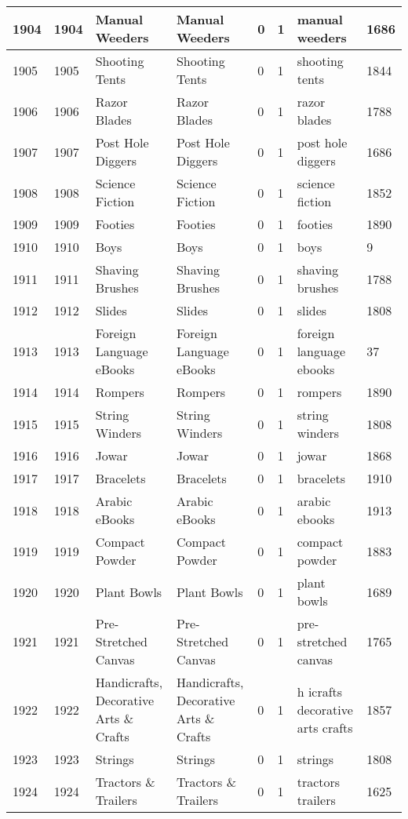 \begin{longtable}{|l|l|l|l|l|l|l|l|}
1904 & 1904 & Manual Weeders & Manual Weeders & 0 & 1 & manual weeders & 1686 \\ \hline 
1905 & 1905 & Shooting Tents & Shooting Tents & 0 & 1 & shooting tents & 1844 \\ \hline 
1906 & 1906 & Razor Blades & Razor Blades & 0 & 1 & razor blades & 1788 \\ \hline 
1907 & 1907 & Post Hole Diggers & Post Hole Diggers & 0 & 1 & post hole diggers & 1686 \\ \hline 
1908 & 1908 & Science Fiction & Science Fiction & 0 & 1 & science fiction & 1852 \\ \hline 
1909 & 1909 & Footies & Footies & 0 & 1 & footies & 1890 \\ \hline 
1910 & 1910 & Boys & Boys & 0 & 1 & boys & 9 \\ \hline 
1911 & 1911 & Shaving Brushes & Shaving Brushes & 0 & 1 & shaving brushes & 1788 \\ \hline 
1912 & 1912 & Slides & Slides & 0 & 1 & slides & 1808 \\ \hline 
1913 & 1913 & Foreign Language eBooks & Foreign Language eBooks & 0 & 1 & foreign language ebooks & 37 \\ \hline 
1914 & 1914 & Rompers & Rompers & 0 & 1 & rompers & 1890 \\ \hline 
1915 & 1915 & String Winders & String Winders & 0 & 1 & string winders & 1808 \\ \hline 
1916 & 1916 & Jowar & Jowar & 0 & 1 & jowar & 1868 \\ \hline 
1917 & 1917 & Bracelets & Bracelets & 0 & 1 & bracelets & 1910 \\ \hline 
1918 & 1918 & Arabic eBooks & Arabic eBooks & 0 & 1 & arabic ebooks & 1913 \\ \hline 
1919 & 1919 & Compact Powder & Compact Powder & 0 & 1 & compact powder & 1883 \\ \hline 
1920 & 1920 & Plant Bowls & Plant Bowls & 0 & 1 & plant bowls & 1689 \\ \hline 
1921 & 1921 & Pre-Stretched Canvas & Pre-Stretched Canvas & 0 & 1 & pre-stretched canvas & 1765 \\ \hline 
1922 & 1922 & Handicrafts, Decorative Arts \& Crafts & Handicrafts, Decorative Arts \& Crafts & 0 & 1 & h icrafts decorative arts crafts & 1857 \\ \hline 
1923 & 1923 & Strings & Strings & 0 & 1 & strings & 1808 \\ \hline 
1924 & 1924 & Tractors \& Trailers & Tractors \& Trailers & 0 & 1 & tractors trailers & 1625 \\ \hline 

\end{longtable}
